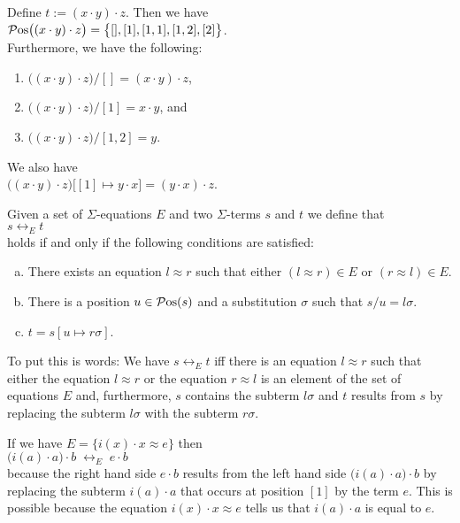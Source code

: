 \example
Define $t := (x \cdot y) \cdot z$.  Then we have
\\[0.2cm]
\hspace*{1.3cm}
$\mathcal{P}\mathrm{os}\bigl((x \cdot y) \cdot z\bigr) = \bigl\{ [], [1], [1,1], [1,2], [2]\bigr\}$.
\\[0.2cm]
Furthermore, we have the following:
\begin{enumerate}

\item $\bigl((x \cdot y) \cdot z\bigr)/[] = (x \cdot y) \cdot z$,
\item $\bigl((x \cdot y) \cdot z\bigr)/[1] = x \cdot y$, and
\item $\bigl((x \cdot y) \cdot z\bigr)/[1,2] = y$.
\end{enumerate}
We also have
\\[0.2cm]
\hspace*{1.3cm}
$\bigl((x \cdot y) \cdot z\bigr)\bigl[[1] \mapsto y \cdot x\bigr] = (y \cdot x) \cdot z$. \eox

\begin{Definition}[$\leftrightarrow_E$]
  Given a set of $\Sigma$-equations $E$ and two $\Sigma$-terms $s$ and $t$ we define that
  \\[0.2cm]
  \hspace*{1.3cm}
  $s \leftrightarrow_E t$
  \\[0.2cm]
  holds if and only if the following conditions are satisfied:
  \begin{enumerate}[(a)]
  \item There exists an equation $l \approx r$  such that either $(l \approx r) \in E$ or $(r \approx l) \in  E$.
  \item There is a position $u \in \mathcal{P}\mathrm{os}(s)$ and a substitution $\sigma$ such that $s/u = l\sigma$.
  \item $t = s[u \mapsto r\sigma]$. \eox
  \end{enumerate}
\end{Definition}
To put this is words: We have $s \leftrightarrow_E t$ iff there is an equation $l \approx r$ such that
either the equation $l \approx r$ or the equation $r \approx l$ is an element of the set of equations $E$ and,
furthermore, $s$ contains the subterm $l\sigma$ and $t$ results from $s$ by replacing the subterm $l\sigma$
with the subterm $r\sigma$. 

\example
If we have $E = \bigl\{ i(x) \cdot x \approx e \bigr\}$ then
\\[0.2cm]
\hspace*{1.3cm}
$\bigl(i(a) \cdot a\bigr) \cdot b \;\leftrightarrow_E\; e \cdot b$
\\[0.2cm]
because the right hand side $e \cdot b$ results from the left hand side $\bigl(i(a) \cdot a\bigr) \cdot b$ by
replacing the subterm $i(a) \cdot a$ that occurs at position $[1]$ by the term $e$.
This is possible because the equation $i(x) \cdot x \approx e$ tells us that $i(a) \cdot a$ is equal to $e$.
\eod

